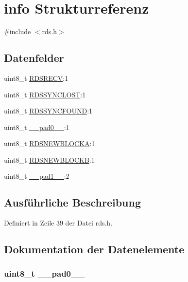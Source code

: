 \hypertarget{structinfo}{}\section{info Strukturreferenz}
\label{structinfo}


{\ttfamily \#include $<$rds.\+h$>$}

\subsection*{Datenfelder}
\begin{DoxyCompactItemize}
\item 
uint8\+\_\+t \hyperlink{structinfo_a56e25cd5c95053ebd95c3c35654680d6}{R\+D\+S\+R\+E\+C\+V}\+:1
\item 
uint8\+\_\+t \hyperlink{structinfo_a73c3d34273c45dd08fcb341496c08052}{R\+D\+S\+S\+Y\+N\+C\+L\+O\+S\+T}\+:1
\item 
uint8\+\_\+t \hyperlink{structinfo_a924e0044d60c0d490d165ceb3ef6b23d}{R\+D\+S\+S\+Y\+N\+C\+F\+O\+U\+N\+D}\+:1
\item 
uint8\+\_\+t \hyperlink{structinfo_a8b4eebe79ded0459acec2f4950102ba3}{\+\_\+\+\_\+pad0\+\_\+\+\_\+}\+:1
\item 
uint8\+\_\+t \hyperlink{structinfo_a62260ece65dc68c2467e5e1b09e5f144}{R\+D\+S\+N\+E\+W\+B\+L\+O\+C\+K\+A}\+:1
\item 
uint8\+\_\+t \hyperlink{structinfo_acd71c83a87b1a99a4784dad5f2a9477f}{R\+D\+S\+N\+E\+W\+B\+L\+O\+C\+K\+B}\+:1
\item 
uint8\+\_\+t \hyperlink{structinfo_a77f12d2e278bd5c07712648ac0df5e08}{\+\_\+\+\_\+pad1\+\_\+\+\_\+}\+:2
\end{DoxyCompactItemize}


\subsection{Ausführliche Beschreibung}


Definiert in Zeile 39 der Datei rds.\+h.



\subsection{Dokumentation der Datenelemente}
\hypertarget{structinfo_a8b4eebe79ded0459acec2f4950102ba3}{}
\subsubsection[{\+\_\+\+\_\+pad0\+\_\+\+\_\+}]{\setlength{\rightskip}{0pt plus 5cm}uint8\+\_\+t \+\_\+\+\_\+pad0\+\_\+\+\_\+}\label{structinfo_a8b4eebe79ded0459acec2f4950102ba3}


